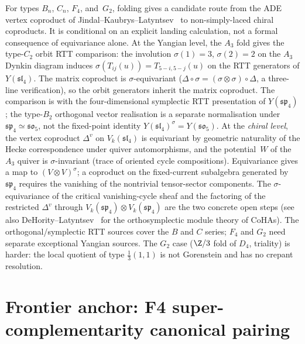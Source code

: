 \begin{remark}
\label{rem:bcfg-folding-route}
For types $B_n$, $C_n$, $F_4$, and~$G_2$, folding gives a
candidate route from the ADE vertex coproduct of
Jindal--Kaubrys--Latyntsev~\cite{JKL26} to non-simply-laced
chiral coproducts. It is conditional on an explicit landing
calculation, not a formal consequence of equivariance alone.
At the Yangian level, the $A_3$ fold gives the type-$C_2$
orbit RTT comparison: the involution
$\sigma(1) = 3$, $\sigma(2) = 2$ on the $A_3$ Dynkin
diagram induces $\sigma(T_{ij}(u)) = T_{5-i,5-j}(u)$
on the RTT generators of $Y(\mathfrak{sl}_4)$.
The matrix coproduct is $\sigma$-equivariant
($\Delta \circ \sigma =
(\sigma \otimes \sigma) \circ \Delta$,
a three-line verification), so the orbit generators inherit
the matrix coproduct. The comparison is with the
four-dimensional symplectic RTT presentation of
$Y(\mathfrak{sp}_4)$; the type-$B_2$ orthogonal vector
realisation is a separate normalisation under
$\mathfrak{sp}_4\simeq\mathfrak{so}_5$, not the fixed-point
identity $Y(\mathfrak{sl}_4)^\sigma=Y(\mathfrak{so}_5)$.
At the \emph{chiral level}, the vertex coproduct
$\Delta^v$ on $V_k(\mathfrak{sl}_4)$ is equivariant by
geometric naturality of the Hecke correspondence under
quiver automorphisms, and the potential~$W$ of the $A_3$
quiver is $\sigma$-invariant (trace of oriented cycle
compositions). Equivariance gives a map to
$(V\otimes V)^\sigma$; a coproduct on the fixed-current
subalgebra generated by $\mathfrak{sp}_4$ requires the
vanishing of the nontrivial tensor-sector components.
The $\sigma$-equivariance of the critical vanishing-cycle
sheaf and the factoring of the restricted $\Delta^v$
through
$V_k(\mathfrak{sp}_4) \otimes V_k(\mathfrak{sp}_4)$
are the two concrete open steps
(see also DeHority--Latyntsev~\cite{DeHorityLatyntsev25}
for the orthosymplectic module theory of CoHAs).
The orthogonal/symplectic RTT sources cover the $B$ and $C$
series; $F_4$ and $G_2$ need separate exceptional Yangian
sources. The $G_2$ case ($\Z/3$ fold of $D_4$, triality) is
harder: the local quotient of type $\tfrac{1}{3}(1,1)$ is
not Gorenstein and has no crepant resolution.
\end{remark}

\section{Frontier anchor: F4 super-complementarity canonical pairing}
\label{sec:ordered-kd-frontier-anchor-f4}

